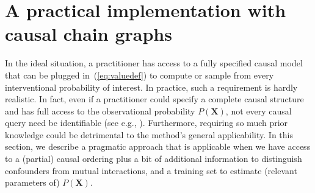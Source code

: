 \documentclass{article}
\newcommand{\vX}{\mathbf{X}}
\newcommand{\expectation}{\mathbb{E}}
\newcommand{\dodo}{\mathit{do}}
\newcommand{\ldo}[1]{\dodo(X_{#1} = x_{#1})}
\begin{document}
%


\section{A practical implementation with causal chain graphs}

In the ideal situation, a practitioner has access to a fully specified causal model that can be plugged in~(\ref{eq:valuedef}) to compute or sample from every interventional probability of interest. In practice, such a requirement is hardly realistic. In fact, even if a practitioner could specify a complete causal structure and has full access to the observational probability $P(\vX)$, not every causal query need be identifiable (see e.g., \cite{pearl2012calculus}). Furthermore, requiring so much prior knowledge could be detrimental to the method's general applicability.
%
%
%
In this section, we describe a pragmatic approach that is applicable when we have access to a (partial) causal ordering plus a bit of additional information to distinguish confounders from mutual interactions, and a training set to estimate (relevant parameters of) $P(\vX)$.
\end{document}
